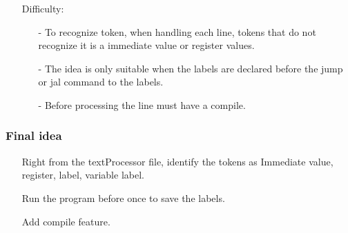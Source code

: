 \documentclass[10pt]{article}
\begin{document}
\begin{large}
\begin{itemize}
            	\item[]
            	    Difficulty:
            	\begin{itemize}
                	\item[-]
                	    To recognize token, when handling each line, tokens that do not recognize it is a immediate value or register values.
                	\item[-]
                	    The idea is only suitable when the labels are declared before the jump or jal command to the labels.
                	\item[-]
                	    Before processing the line must have a compile.
                \end{itemize}
            \end{itemize}
        \subsubsection{Final idea}
            \begin{itemize}
            	\item[]
            	    Right from the textProcessor file, identify the tokens as Immediate value, register, label, variable label.
            	\item[]
            	    Run the program before once to save the labels.
            	\item[]
            	    Add compile feature.
            \end{itemize}
\end{large}
\end{document}
